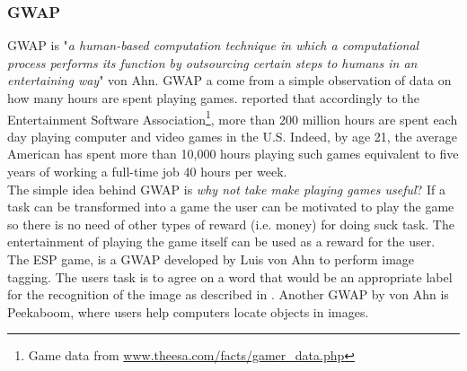 \subsubsection{\acl{GWAP}}
\acf{GWAP} is "\emph{a human-based computation technique in which a computational
process performs its function by outsourcing certain steps to humans in an
entertaining way}" von Ahn.
\ac{GWAP} a come from a simple observation of data on how many hours are spent
playing games. \cite{von2008designing} reported that accordingly to the
Entertainment Software Association\footnote{Game data from
\url{www.theesa.com/facts/gamer_data.php}}, more than 200 million hours are spent
each day playing computer and video games in the U.S. Indeed, by age 21, the
average American has spent more than 10,000 hours playing such games equivalent
to five years of working a full-time job 40 hours per week.\\

The simple idea behind \ac{GWAP} is \emph{why not take make playing games useful}?
If a task can be transformed into a game the user can be motivated to play the
game so there is no need of other types of reward (i.e. money) for doing suck
task. The entertainment of playing the game itself can be used as a reward for
the user.\\

The ESP game, is a \ac{GWAP} developed by Luis von Ahn to perform image tagging.
The users task is to agree on a word that would be an appropriate label for the
recognition of the image as described in \cite{von2004labeling}. Another \ac{GWAP}
by von Ahn is Peekaboom, where users help computers locate objects in images.